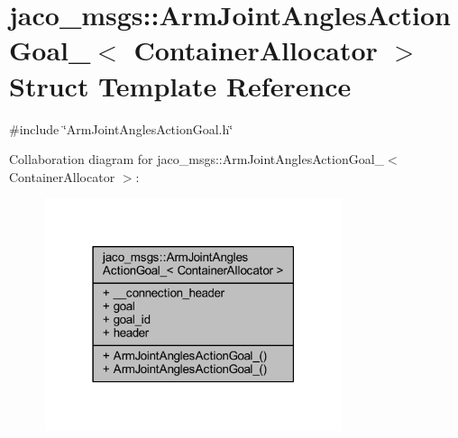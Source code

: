 \hypertarget{structjaco__msgs_1_1ArmJointAnglesActionGoal__}{}\section{jaco\+\_\+msgs\+:\+:Arm\+Joint\+Angles\+Action\+Goal\+\_\+$<$ Container\+Allocator $>$ Struct Template Reference}
\label{structjaco__msgs_1_1ArmJointAnglesActionGoal__}


{\ttfamily \#include \char`\"{}Arm\+Joint\+Angles\+Action\+Goal.\+h\char`\"{}}



Collaboration diagram for jaco\+\_\+msgs\+:\+:Arm\+Joint\+Angles\+Action\+Goal\+\_\+$<$ Container\+Allocator $>$\+:
\nopagebreak
\begin{figure}[H]
\begin{center}
\leavevmode
\includegraphics[width=247pt]{df/d7d/structjaco__msgs_1_1ArmJointAnglesActionGoal____coll__graph}
\end{center}
\end{figure}
